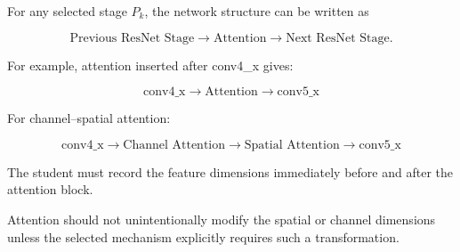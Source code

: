 \documentclass[10pt]{article}
\begin{document}
For any selected stage $P_k$, the network structure can be written as

\[
\text{Previous ResNet Stage}
\rightarrow
\text{Attention}
\rightarrow
\text{Next ResNet Stage}.
\]

For example, attention inserted after conv4\_x gives:

\[
\boxed{
\text{conv4\_x}
\rightarrow
\text{Attention}
\rightarrow
\text{conv5\_x}
}
\]

For channel--spatial attention:

\[
\boxed{
\text{conv4\_x}
\rightarrow
\text{Channel Attention}
\rightarrow
\text{Spatial Attention}
\rightarrow
\text{conv5\_x}
}
\]

The student must record the feature dimensions immediately before and after
the attention block.

Attention should not unintentionally modify the spatial or channel
dimensions unless the selected mechanism explicitly requires such a
transformation.
\end{document}
